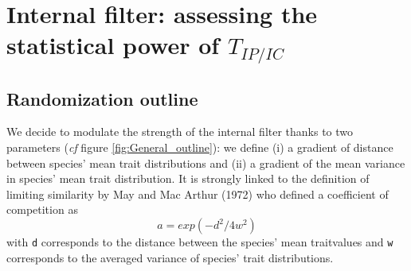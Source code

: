 \documentclass[12pt]{article}\usepackage[]{graphicx}\usepackage[]{color}
\begin{document}
\cleardoublepage

\section{Internal filter: assessing the statistical power of $T_{IP/IC}$}
  \subsection {Randomization outline}
 
We decide to modulate the strength of the internal filter thanks to two parameters (\textit{cf} figure \ref{fig:General_outline}):
we define (i) a gradient of distance between species' mean trait distributions and (ii) a gradient of the mean variance in species' mean trait distribution. It is strongly linked to the definition of limiting similarity by May and Mac Arthur (1972) who defined a coefficient of competition as $$a = exp (-d^2/4w^2)$$ with \texttt{d} corresponds to the distance between the species' mean traitvalues and \texttt{w} corresponds to the averaged variance of species' trait distributions. 
\end{document}
